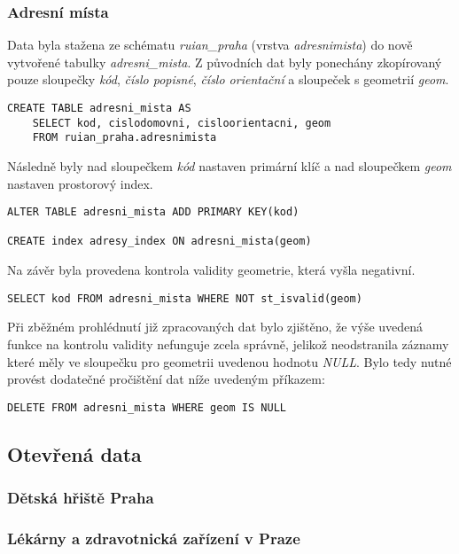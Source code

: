 \documentclass[a4paper, 12pt]{article}
\begin{document}
\subsubsection*{Adresní místa}
Data byla stažena ze schématu \textit{ruian\_praha} (vrstva \textit{adresnimista}) do nově vytvořené tabulky \textsl{adresni\_mista}. Z původních dat byly ponechány zkopírovaný pouze sloupečky \textsl{kód}, \textsl{číslo popisné}, \textsl{číslo orientační} a sloupeček s geometrií \textsl{geom}. 
\begin{lstlisting}
CREATE TABLE adresni_mista AS
    SELECT kod, cislodomovni, cisloorientacni, geom
    FROM ruian_praha.adresnimista
\end{lstlisting}

Následně byly nad sloupečkem \textsl{kód} nastaven primární klíč a nad sloupečkem \textsl{geom} nastaven prostorový index.
\begin{lstlisting}
ALTER TABLE adresni_mista ADD PRIMARY KEY(kod)

CREATE index adresy_index ON adresni_mista(geom)
\end{lstlisting}

Na závěr byla provedena kontrola validity geometrie, která vyšla negativní.
\begin{lstlisting}
SELECT kod FROM adresni_mista WHERE NOT st_isvalid(geom)
\end{lstlisting}
Při zběžném prohlédnutí již zpracovaných dat bylo zjištěno, že výše uvedená funkce na kontrolu validity nefunguje zcela správně, jelikož neodstranila záznamy které měly ve sloupečku pro geometrii uvedenou hodnotu \textit{NULL}. Bylo tedy nutné provést dodatečné pročištění dat níže uvedeným příkazem:
\begin{lstlisting}
DELETE FROM adresni_mista WHERE geom IS NULL
\end{lstlisting}

\subsection{Otevřená data}

\subsubsection*{Dětská hřiště Praha}

\subsubsection*{Lékárny a zdravotnická zařízení v Praze}
\end{document}
